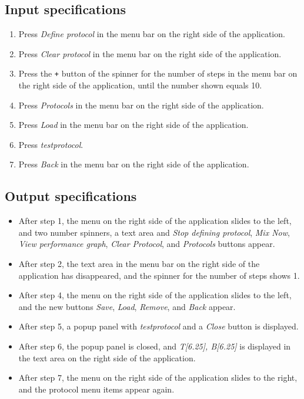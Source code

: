 \subsection*{Input specifications}
\begin{enumerate}
\item Press \emph{Define protocol} in the menu bar on the right side of the application.
\item Press \emph{Clear protocol} in the menu bar on the right side of the application.
\item Press the \texttt{+} button of the spinner for the number of steps in the menu bar on the right side of the application, until the number shown equals 10.
\item Press \emph{Protocols} in the menu bar on the right side of the application.
\item Press \emph{Load} in the menu bar on the right side of the application.
\item Press \emph{testprotocol}.
\item Press \emph{Back} in the menu bar on the right side of the application.
\end{enumerate}

\subsection*{Output specifications}
\begin{itemize}
\item After step 1, the menu on the right side of the application slides to the left, and two number spinners, a text area and \emph{Stop defining protocol}, \emph{Mix Now}, \emph{View performance graph}, \emph{Clear Protocol}, and \emph{Protocols} buttons appear.
\item After step 2, the text area in the menu bar on the right side of the application has disappeared, and the spinner for the number of steps shows 1.
\item After step 4, the menu on the right side of the application slides to the left, and the new buttons \emph{Save}, \emph{Load}, \emph{Remove}, and \emph{Back} appear.
\item After step 5, a popup panel with \emph{testprotocol} and a \emph{Close} button is displayed.
\item After step 6, the popup panel is closed, and \emph{T[6.25], B[6.25]} is displayed in the text area on the right side of the application.
\item After step 7, the menu on the right side of the application slides to the right, and the protocol menu items appear again.
\end{itemize}

